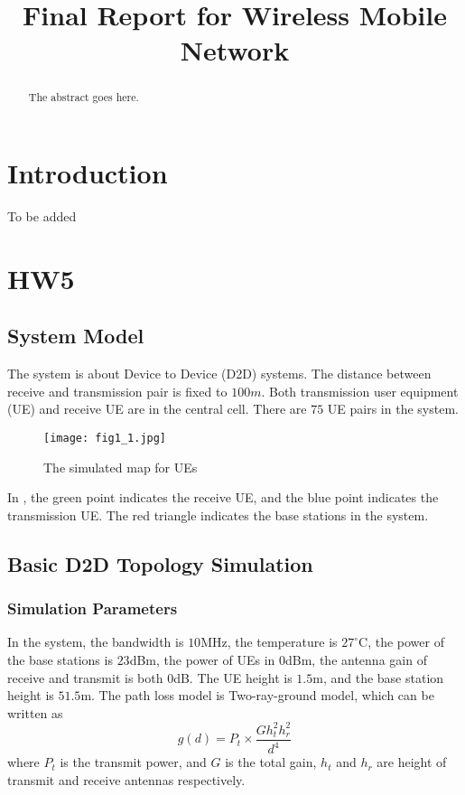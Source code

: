 \documentclass[conference]{IEEEtran}
\begin{document}
\title{Final Report for Wireless Mobile Network}
\author{
}
\maketitle
\begin{abstract}
The abstract goes here.
\end{abstract}

\section{Introduction}
To be added
\section{HW5}
\subsection{System Model}
The system is about Device to Device (D2D) systems. The distance between receive and transmission pair is fixed to $100m$. Both transmission user equipment (UE) and receive UE are in the central cell. There are $75$ UE pairs in the system.
\begin{figure}[htbp]
    \centering
    \texttt{[image: fig1\_1.jpg]}
    \caption{The simulated map for UEs}
    \label{fig:ue_map}
\end{figure}


In , the green point indicates the receive UE, and the blue point indicates the transmission UE. The red triangle indicates the base stations in the system.  
\subsection{Basic D2D Topology Simulation}
\subsubsection{Simulation Parameters}
In the system, the bandwidth is $10$MHz, the temperature is $27^\circ$C, the power of the base stations is $23$dBm, the power of UEs in $0$dBm, the antenna gain of receive and transmit is both $0$dB. The UE height is $1.5$m, and the base station height is $51.5$m. The path loss model is Two-ray-ground model, which can be written as
\begin{equation}\label{eqn:two_ray}
    g(d) = P_t \times \dfrac{Gh_t^2h_r^2}{d^4}
\end{equation}
where $P_t$ is the transmit power, and $G$ is the total gain, $h_t$ and $h_r$ are height of transmit and receive antennas respectively.
\end{document}
